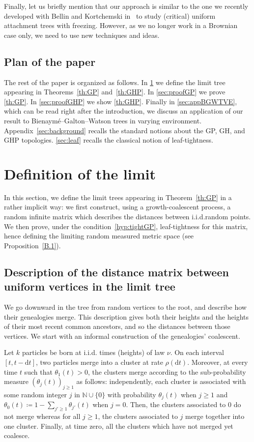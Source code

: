 \documentclass[10pt]{amsart}
\theoremstyle{definition}\newtheorem{defi}[theo]{Definition}\newtheorem{rema}[theo]{Remark}\newtheorem{exam}[theo]{Example}\newtheorem{exem}[theo]{Example}\newtheorem{nota}[theo]{Notation}
\newcommand{\rmd}{\mathrm{d}}
\newcommand{\N}{\mathbb{N}}
\newcommand{\1}{\mathbbm{1}}
\begin{document}
Finally, let us briefly mention that our approach is similar to the one we recently developed with Bellin and Kortchemski in~\cite{BBKK23+,BBKKbis23+} to study (critical) uniform attachment trees with freezing. However, as we no longer work in a Brownian case only, we need to use new techniques and ideas.

\subsection*{Plan of the paper}
The rest of the paper is organized as follows. In \cref{sec:deflimit} we define the limit tree appearing in Theorems~\ref{th:GP} and~\ref{th:GHP}. In \cref{sec:proofGP} we prove \cref{th:GP}. In \cref{sec:proofGHP} we show \cref{th:GHP}. Finally in \cref{sec:appBGWTVE}, which can be read right after the introduction, we discuss an application of our result to Bienaymé--Galton--Watson trees in varying environment. Appendix~\ref{sec:background} recalls the standard notions about the GP, GH, and GHP topologies. \cref{sec:leaf} recalls the classical notion of leaf-tightness.

\section{Definition of the limit} \label{sec:deflimit}
In this section, we define the limit trees appearing in Theorem~\ref{th:GP} in a rather implicit way: we first construct, using a growth-coalescent process, a random infinite matrix which describes the distances between i.i.d.\@ random points. We then prove, under the condition~\ref{hyp:tightGP}, leaf-tightness for this matrix, hence defining the limiting random measured metric space (see Proposition~\ref{B.1}).

\subsection{Description of the distance matrix between uniform vertices in the limit tree}\label{sec: coalescent continu}
We go downward in the tree from random vertices to the root, and describe how their genealogies merge. This description gives both their heights and the heights of their most recent common ancestors, and so the distances between those vertices. We start with an informal construction of the genealogies' coalescent.

Let $k$ particles be born at i.i.d. times (heights) of law $\nu$. On each interval $[t,t-\rmd t]$, two particles merge into a cluster at rate $\rho(\rmd t)$. Moreover, at every time $t$ such that $\theta_1(t)>0$, the clusters merge according to the sub-probability measure $(\theta_j(t))_{j \ge 1}$ as follows: independently, each cluster is associated with some random integer $j$ in $\N \cup \{0\}$ with probability $\theta_j(t)$ when $j\ge 1$ and $\theta_0(t)\coloneqq1-\sum_{j'\ge 1} \theta_{j'}(t)$ when $j=0$. Then, the clusters associated to $0$ do not merge whereas for all $j \ge 1$, the clusters associated to $j$ merge together into one cluster. Finally, at time zero, all the clusters which have not merged yet coalesce.
\end{document}
